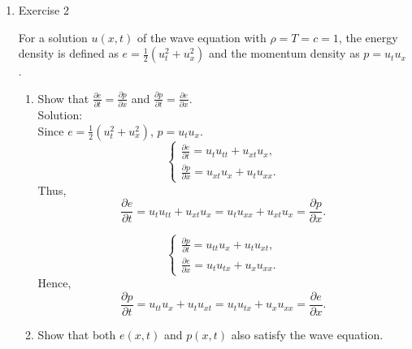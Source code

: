 \documentclass[12pt]{article}%
\begin{document}
\begin{enumerate}
\begin{enumerate}

        
        \item Exercise 2 \smallskip 

        For a solution $u\left(x,t\right)$ of the wave equation with $\rho = T = c = 1$, the energy density is defined as $e = \frac{1}{2}\left(u_t^2 + u_x^2\right)$ and the momentum density as $p =u_tu_x$.\smallskip 
        \begin{enumerate}
            \item Show that $\frac{\partial e}{\partial t} = \frac{\partial p}{\partial x}$ and $\frac{\partial p}{\partial t} = \frac{\partial e}{\partial x}$. \smallskip \\
            Solution: \\
            Since $e=\frac{1}{2}\left(u_{t}^{2}+u_{x}^{2}\right)$, $p=u_{t} u_{x} $.
            \begin{equation*}
                \begin{cases}
                    \frac{\partial e}{\partial t}=u_{t} u_{tt}+u_{xt} u_{x},
                    \\
                    \frac{\partial p}{\partial x}=u_{xt} u_{x}+u_{t} u_{xx}.
                \end{cases}
            \end{equation*}
            Thus, \[\frac{\partial e}{\partial t}=u_{t} u_{t t}+u_{x t} u_{x}=u_{t} u_{x x}+u_{x t} u_{x}=\frac{\partial p}{\partial x} .\]
            
            \begin{equation*}
                \begin{cases}
                    \frac{\partial p}{\partial t}=u_{tt} u_{x}+u_{t} u_{xt},
                    \\
                    \frac{\partial e}{\partial x}=u_{t} u_{tx}+u_{x} u_{xx}.
                \end{cases}
            \end{equation*}
            Hence, \[\frac{\partial p}{\partial t}=u_{tt} u_{x}+u_{t} u_{xt}=u_{t} u_{tx}+u_{x} u_{xx}=\frac{\partial e}{\partial x} .\]
            


            \item Show that both $e\left(x,t\right)$ and $p\left(x,t\right)$ also satisfy the wave equation.    
           

\end{enumerate}
\end{enumerate}
\end{enumerate}
\end{document}
